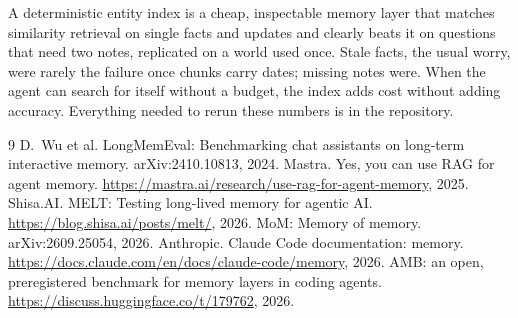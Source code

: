 \documentclass[11pt]{article}
\begin{document}
A deterministic entity index is a cheap, inspectable memory layer that matches similarity retrieval on single facts
and updates and clearly beats it on questions that need two notes, replicated on a world used once. Stale facts,
the usual worry, were rarely the failure once chunks carry dates; missing notes were. When the agent can search for
itself without a budget, the index adds cost without adding accuracy. Everything needed to rerun these numbers is in
the repository.

\begin{thebibliography}{9}\small
{} D.~Wu et al. LongMemEval: Benchmarking chat assistants on long-term interactive memory. arXiv:2410.10813, 2024.
 Mastra. Yes, you can use RAG for agent memory. \url{https://mastra.ai/research/use-rag-for-agent-memory}, 2025.
 Shisa.AI. MELT: Testing long-lived memory for agentic AI. \url{https://blog.shisa.ai/posts/melt/}, 2026.
 MoM: Memory of memory. arXiv:2609.25054, 2026.
 Anthropic. Claude Code documentation: memory. \url{https://docs.claude.com/en/docs/claude-code/memory}, 2026.
 AMB: an open, preregistered benchmark for memory layers in coding agents. \url{https://discuss.huggingface.co/t/179762}, 2026.
\end{thebibliography}
\end{document}
